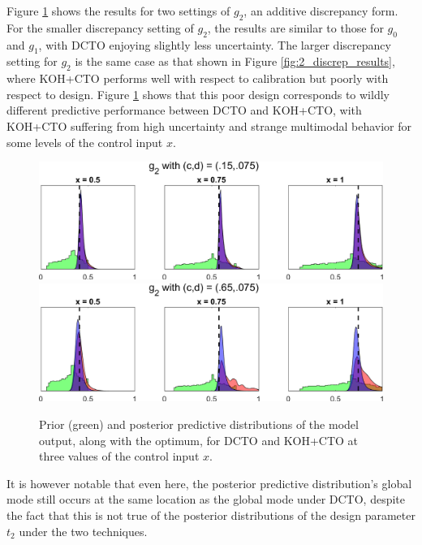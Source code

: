 \documentclass[12pt]{article}
\begin{document}
%
Figure \ref{fig:2_post_dist} shows the results for two settings of $g_2$, an additive discrepancy form.
%
For the smaller discrepancy setting of $g_2$, the results are similar to those for $g_0$ and $g_1$, with DCTO enjoying slightly less uncertainty.
%
The larger discrepancy setting for $g_2$ is the same case as that shown in Figure \ref{fig:2_discrep_results}, where KOH+CTO performs well with respect to calibration but poorly with respect to design.
%
Figure \ref{fig:2_post_dist} shows that this poor design corresponds to wildly different predictive performance between DCTO and KOH+CTO, with KOH+CTO suffering from high uncertainty and strange multimodal behavior for some levels of the control input $x$.
%
\begin{figure}
	\centering
	\includegraphics[scale=0.85]{FIG_DCTO_KOHCTO_post_pred_dist_discrep3}\\
	\vspace{1em}
	\includegraphics[scale=0.85]{FIG_DCTO_KOHCTO_post_pred_dist_discrep4}
	\captionsetup{width=.85\linewidth}
	\caption{Prior (green) and posterior predictive distributions of the model output, along with the optimum, for DCTO and KOH+CTO at three values of the control input $x$.}
	\label{fig:2_post_dist}
\end{figure}
%
It is however notable that even here, the posterior predictive distribution's global mode still occurs at the same location as the global mode under DCTO, despite the fact that this is not true of the posterior distributions of the design parameter $t_2$ under the two techniques.
%
\end{document}
